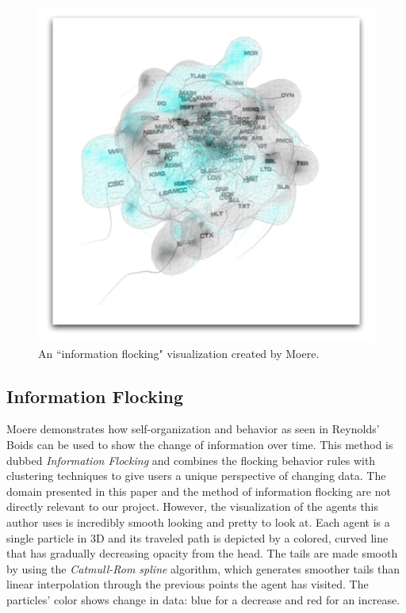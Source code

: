 \documentclass[conference]{IEEEtran}
\begin{document}
\begin{figure}
\centering
\includegraphics[scale=.4]{images/blob.pdf}
\caption{An ``information flocking" visualization created by Moere\cite{1382896}.}
\label{Blob}
\end{figure}

\subsection{Information Flocking}
Moere demonstrates how self-organization and behavior as seen in Reynolds' Boids can be used to show the change of information over time\cite{1382896}. This method is dubbed {\em Information Flocking} and combines the flocking behavior rules with clustering techniques to give users a unique perspective of changing data.  The domain presented in this paper and the method of information flocking are not directly relevant to our project. However, the visualization of the agents this author uses is incredibly smooth looking and pretty to look at. Each agent is a single particle in 3D and its traveled path is depicted by a colored, curved line that has gradually decreasing opacity from the head. The tails are made smooth by using the {\em Catmull-Rom spline} algorithm, which generates smoother tails than linear interpolation through the previous points the agent has visited. The particles' color shows change in data: blue for a decrease and red for an increase.
\end{document}
